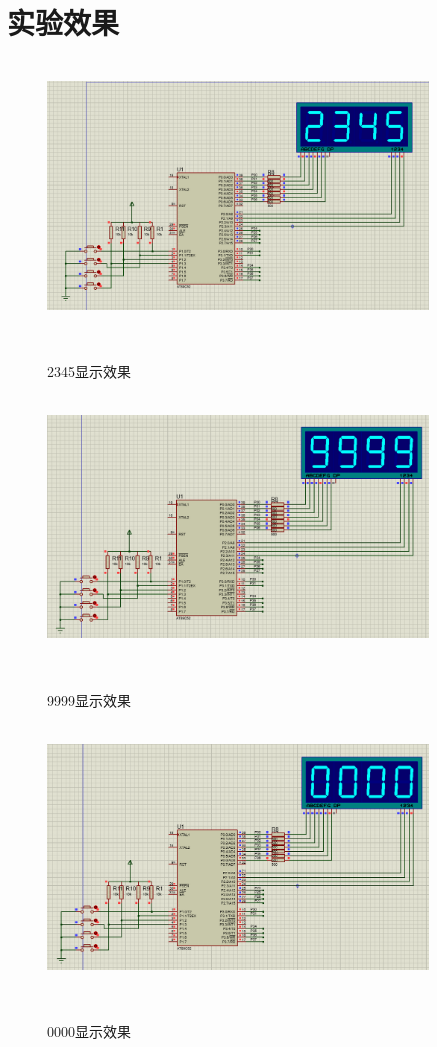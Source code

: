 \documentclass[12pt,hyperref,a4paper,UTF8]{ctexart}
\begin{document}
\section{实验效果}

\begin{figure}[H] %
    \centering
    \includegraphics[width=0.9\textwidth]{figures/201.png} %
    \caption{2345显示效果 } %
    \label{fig:example} %
\end{figure}

\begin{figure}[H] %
    \centering
    \includegraphics[width=0.9\textwidth]{figures/202.png} %
    \caption{9999显示效果 } %
    \label{fig:example} %
\end{figure}

\begin{figure}[H] %
    \centering
    \includegraphics[width=0.9\textwidth]{figures/203.png} %
    \caption{0000显示效果 } %
    \label{fig:example} %
\end{figure}
\end{document}

